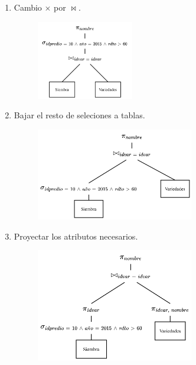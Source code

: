 \documentclass{templateNote}
\begin{document}
\begin{enumerate}
\begin{itemize}
\begin{enumerate}
            \newpage
            \item Cambio $\times$ por $\Join$.
            \begin{figure}[H]
                \centering
                \includegraphics[width=0.4\textwidth]{img/E1-Paso-4.png}
            \end{figure}

            \item Bajar el resto de seleciones a tablas.
            \begin{figure}[H]
                \centering
                \includegraphics[width=0.65\textwidth]{img/E1-Paso-5.png}
            \end{figure}

            \item Proyectar los atributos necesarios.
            \begin{figure}[H]
                \centering
                \includegraphics[width=0.65\textwidth]{img/E1-Paso-6.png}
            \end{figure}
        \end{enumerate}
    \end{itemize}


\end{enumerate}
\end{document}
